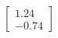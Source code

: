 \documentclass[preview]{standalone}
\begin{document}
\begin{align*}
\begin{bmatrix} 1.24 \\ -0.74 \end{bmatrix}
\end{align*}
\end{document}
